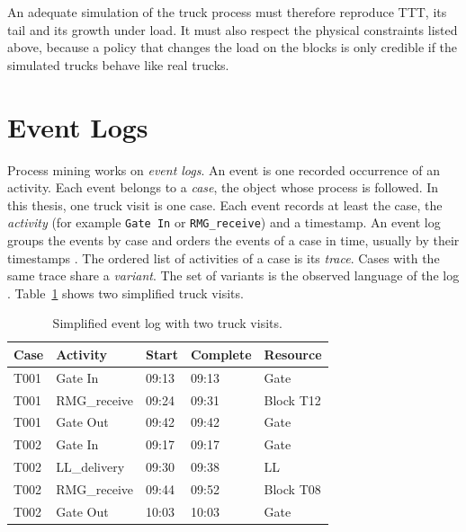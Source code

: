 An adequate simulation of the truck process must therefore reproduce TTT, its
tail and its growth under load. It must also respect the physical constraints
listed above, because a policy that changes the load on the blocks is only
credible if the simulated trucks behave like real trucks.

\section{Event Logs}
\label{sec:operational_data_event_logs}

Process mining works on \emph{event logs}. An event is one recorded
occurrence of an activity. Each event belongs to a \emph{case}, the object
whose process is followed. In this thesis, one truck visit is one case. Each
event records at least the case, the \emph{activity} (for example
\texttt{Gate In} or \texttt{RMG\_receive}) and a timestamp. An event log groups
the events by case and orders the events of a case in time, usually by their
timestamps \cite{DeWeerdt2022EventData}. The ordered list of activities of a
case is its \emph{trace}. Cases with the same trace share a \emph{variant}. The
set of variants is the observed language of the log
\cite{Aalst2016}. Table~\ref{tab:eventlogexample} shows two simplified
truck visits.

\begin{table}[htbp]
\centering
\begin{tabular}{lllll}
\toprule
\textbf{Case} & \textbf{Activity} & \textbf{Start} & \textbf{Complete} & \textbf{Resource} \\
\midrule
T001 & Gate In      & 09:13 & 09:13 & Gate \\
T001 & RMG\_receive & 09:24 & 09:31 & Block T12 \\
T001 & Gate Out     & 09:42 & 09:42 & Gate \\
T002 & Gate In      & 09:17 & 09:17 & Gate \\
T002 & LL\_delivery & 09:30 & 09:38 & LL \\
T002 & RMG\_receive & 09:44 & 09:52 & Block T08 \\
T002 & Gate Out     & 10:03 & 10:03 & Gate \\
\bottomrule
\end{tabular}
\par{}
\caption{Simplified event log with two truck visits.}
\label{tab:eventlogexample}
\end{table}

